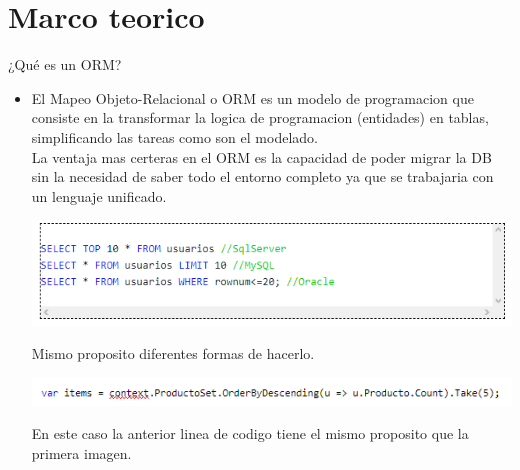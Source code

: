 \section{Marco teorico} 
¿Qué es un ORM?
\begin{itemize}
	\item El Mapeo Objeto-Relacional o ORM  es un modelo de programacion que consiste en la transformar la logica de programacion (entidades) en tablas, simplificando las tareas como son el modelado.
	\\La ventaja mas certeras en el ORM es la capacidad de poder migrar la DB sin la necesidad de saber todo el entorno completo ya que se trabajaria con un lenguaje unificado.
	\begin{center}
	\includegraphics[width=13cm]{./Imagenes/orm_1} 
	\end{center}
	Mismo proposito diferentes formas de hacerlo.
	\begin{center}
	\includegraphics[width=13cm]{./Imagenes/orm_2} 
	\end{center}
	En este caso la anterior linea de codigo tiene el mismo proposito que la primera imagen.

\end{itemize} 
